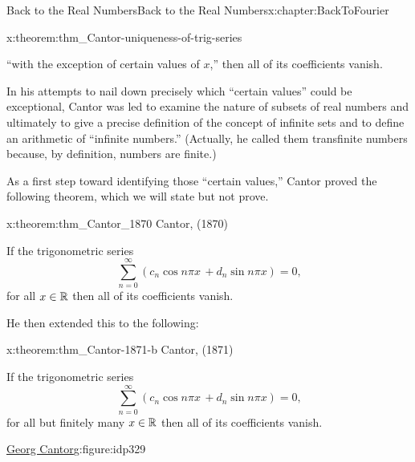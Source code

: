 \begin{chapterptx}{Back to the Real Numbers}{}{Back to the Real Numbers}{}{}{x:chapter:BackToFourier}
\begin{introduction}{}
\begin{theorem}{}{}{x:theorem:thm_Cantor-uniqueness-of-trig-series}
			\par
			``with the exception of certain values of \(x\),'' then all of its coefficients vanish.%
		\end{theorem}
		In his attempts to nail down precisely which ``certain values'' could be exceptional, Cantor was led to examine the nature of subsets of real numbers and ultimately to give a precise definition of the concept of infinite sets and to define an arithmetic of ``infinite numbers.'' (Actually, he called them \textbraceleft{}transfinite numbers\textbraceright{} because, by definition, numbers are finite.)%
		\par
		As a first step toward identifying those ``certain values,'' Cantor proved the following theorem, which we will state but not prove.%
		\begin{theorem}{}{}{x:theorem:thm_Cantor_1870}%
			\alert{Cantor, (1870)}%
			\par
			 If the trigonometric series%
			\begin{equation*}
				\sum_{n=0}^\infty\left(c_n\cos n\pi  x\,+d_n\sin n\pi x\right) = 0\text{,}
			\end{equation*}
			for all \(x\in\mathbb {R}\) then all of its coefficients vanish.%
		\end{theorem}
		He then extended this to the following:%
		\begin{theorem}{}{}{x:theorem:thm_Cantor-1871-b}%
			\alert{Cantor, (1871)}%
			\par
			 If the trigonometric series%
			\begin{equation*}
				\sum_{n=0}^\infty\left(c_n\cos n\pi  x\,+d_n\sin n\pi x\right) = 0\text{,}
			\end{equation*}
			for all but finitely many \(x\in\mathbb {R}\) then all of its coefficients vanish.%
		\end{theorem}
		\begin{figureptx}{\href{https://mathshistory.st-andrews.ac.uk/Biographies/Cantor/}{Georg Cantor}\protect\footnotemark{}}{g:figure:idp329}{}%
			\begin{image}{0.325}{0.35}{0.325}%

\end{image}
\end{figureptx}
\end{introduction}
\end{chapterptx}
